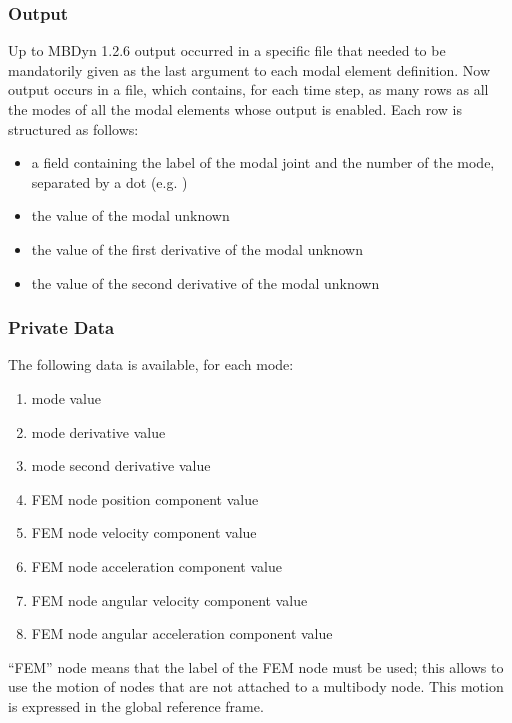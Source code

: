 \subsubsection{Output}
Up to MBDyn 1.2.6 output occurred in a specific file that needed
to be mandatorily given as the last argument to each modal element
definition.
Now output occurs in a  file, which contains, for each time step,
as many rows as all the modes of all the modal elements whose output is enabled.
Each row is structured as follows:
\begin{itemize}
\item a field containing the label of the modal joint and the number of the mode,
separated by a dot (e.g. )
\item the value of the modal unknown
\item the value of the first derivative of the modal unknown
\item the value of the second derivative of the modal unknown
\end{itemize}

\subsubsection{Private Data}
The following data is available, for each mode:
\begin{enumerate}
\item {} mode  value
\item {} mode  derivative value
\item {} mode  second derivative value
\item {} FEM node  position  component value
\item {} FEM node  velocity  component value
\item {} FEM node  acceleration  component value
\item {} FEM node  angular velocity  component value
\item {} FEM node  angular acceleration  component value
\end{enumerate}
``FEM'' node means that the label of the FEM node must be used;
this allows to use the motion of nodes that are not attached
to a multibody node.
This motion is expressed in the global reference frame.




